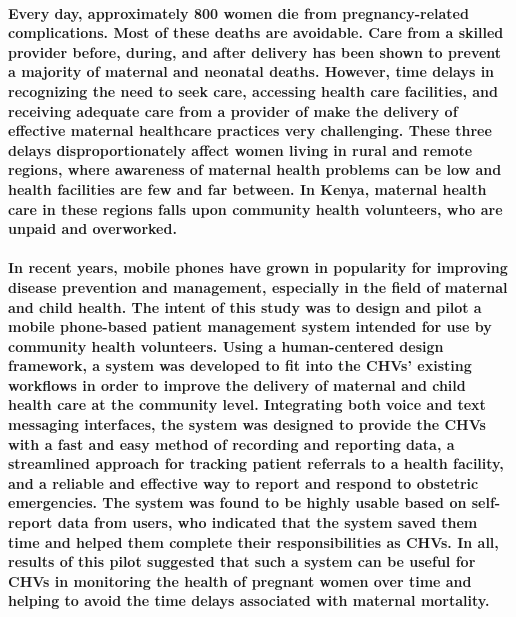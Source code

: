 \abstract


\paragraph{Every day, approximately 800 women die from pregnancy-related complications. Most of these deaths are avoidable. Care from a skilled provider before, during, and after delivery has been shown to prevent a majority of maternal and neonatal deaths. However, time delays in recognizing the need to seek care, accessing health care facilities, and receiving adequate care from a provider of make the delivery of effective maternal healthcare practices very challenging. These three delays disproportionately affect women living in rural and remote regions, where awareness of maternal health problems can be low and health facilities are few and far between. In Kenya, maternal health care in these regions falls upon community health volunteers, who are unpaid and overworked.}

\paragraph{In recent years, mobile phones have grown in popularity for improving disease prevention and management, especially in the field of maternal and child health. The intent of this study was to design and pilot a mobile phone-based patient management system intended for use by community health volunteers. Using a human-centered design framework, a system was developed to fit into the CHVs' existing workflows in order to improve the delivery of maternal and child health care at the community level. Integrating both voice and text messaging interfaces, the system was designed to provide the CHVs with a fast and easy method of recording and reporting data, a streamlined approach for tracking patient referrals to a health facility, and a reliable and effective way to report and respond to obstetric emergencies. The system was found to be highly usable based on self-report data from users, who indicated that the system saved them time and helped them complete their responsibilities as CHVs. In all, results of this pilot suggested that such a system can be useful for CHVs in monitoring the health of pregnant women over time and helping to avoid the time delays associated with maternal mortality.}